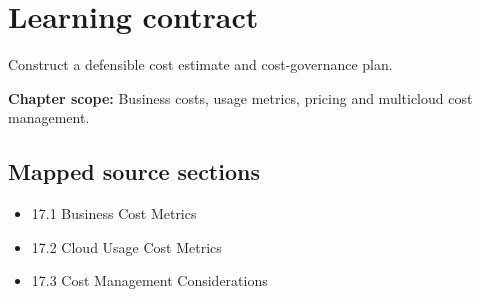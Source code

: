 \documentclass[10pt,letterpaper]{article}
\begin{document}
\sourceStatement
\tableofcontents
\newpage
\section{Learning contract}
\begin{takeaway}
Construct a defensible cost estimate and cost-governance plan.
\end{takeaway}
\textbf{Chapter scope:} Business costs, usage metrics, pricing and multicloud cost management.\\
\subsection{Mapped source sections}
\begin{itemize}
\item 17.1 Business Cost Metrics
\item 17.2 Cloud Usage Cost Metrics
\item 17.3 Cost Management Considerations
\end{itemize}
\end{document}
